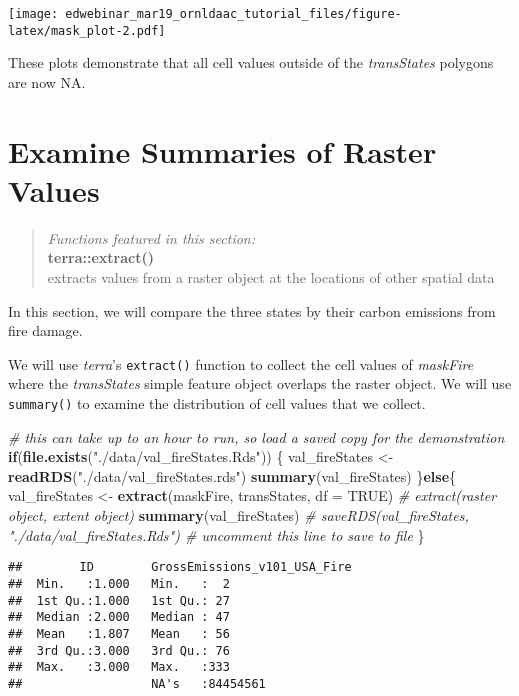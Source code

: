 \documentclass[
]{article}
\newenvironment{Shaded}{\begin{snugshade}}{\end{snugshade}}
\newcommand{\AttributeTok}[1]{\textcolor[rgb]{0.13,0.29,0.53}{#1}}
\newcommand{\CommentTok}[1]{\textcolor[rgb]{0.56,0.35,0.01}{\textit{#1}}}
\newcommand{\ConstantTok}[1]{\textcolor[rgb]{0.56,0.35,0.01}{#1}}
\newcommand{\ControlFlowTok}[1]{\textcolor[rgb]{0.13,0.29,0.53}{\textbf{#1}}}
\newcommand{\FunctionTok}[1]{\textcolor[rgb]{0.13,0.29,0.53}{\textbf{#1}}}
\newcommand{\NormalTok}[1]{#1}
\newcommand{\OtherTok}[1]{\textcolor[rgb]{0.56,0.35,0.01}{#1}}
\newcommand{\StringTok}[1]{\textcolor[rgb]{0.31,0.60,0.02}{#1}}
\begin{document}
\texttt{[image: edwebinar\_mar19\_ornldaac\_tutorial\_files/figure-latex/mask\_plot-2.pdf]}

These plots demonstrate that all cell values outside of the
\emph{transStates} polygons are now NA.

\hypertarget{examine-summaries-of-raster-values}{%
\section{Examine Summaries of Raster
Values}\label{examine-summaries-of-raster-values}}

\begin{quote}
\emph{Functions featured in this section:}\\
\textbf{terra::extract()}\\
extracts values from a raster object at the locations of other spatial
data
\end{quote}

In this section, we will compare the three states by their carbon
emissions from fire damage.

We will use \emph{terra}'s \texttt{extract()} function to collect the
cell values of \emph{maskFire} where the \emph{transStates} simple
feature object overlaps the raster object. We will use
\texttt{summary()} to examine the distribution of cell values that we
collect.

\begin{Shaded}
\begin{Highlighting}[]
\CommentTok{\# this can take up to an hour to run, so load a saved copy for the demonstration}
\ControlFlowTok{if}\NormalTok{(}\FunctionTok{file.exists}\NormalTok{(}\StringTok{"./data/val\_fireStates.Rds"}\NormalTok{)) \{ }
\NormalTok{  val\_fireStates }\OtherTok{\textless{}{-}} \FunctionTok{readRDS}\NormalTok{(}\StringTok{"./data/val\_fireStates.rds"}\NormalTok{) }
  \FunctionTok{summary}\NormalTok{(val\_fireStates) }
\NormalTok{  \}}\ControlFlowTok{else}\NormalTok{\{ }
\NormalTok{    val\_fireStates }\OtherTok{\textless{}{-}} \FunctionTok{extract}\NormalTok{(maskFire, transStates, }\AttributeTok{df =} \ConstantTok{TRUE}\NormalTok{)  }\CommentTok{\# extract(raster object, extent object) }
    \FunctionTok{summary}\NormalTok{(val\_fireStates) }
    \CommentTok{\# saveRDS(val\_fireStates, "./data/val\_fireStates.Rds") \# uncomment this line to save to file}
\NormalTok{  \}}
\end{Highlighting}
\end{Shaded}

\begin{verbatim}
##        ID        GrossEmissions_v101_USA_Fire
##  Min.   :1.000   Min.   :  2                 
##  1st Qu.:1.000   1st Qu.: 27                 
##  Median :2.000   Median : 47                 
##  Mean   :1.807   Mean   : 56                 
##  3rd Qu.:3.000   3rd Qu.: 76                 
##  Max.   :3.000   Max.   :333                 
##                  NA's   :84454561
\end{verbatim}
\end{document}
